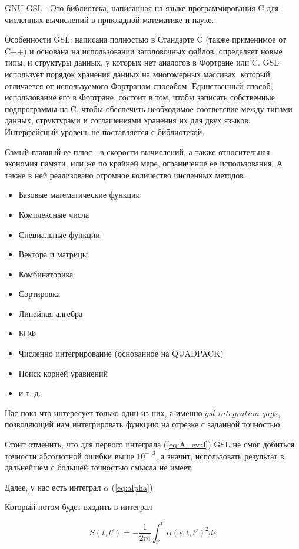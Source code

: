 \documentclass[14pt]{extarticle}
\begin{document}
GNU GSL - Это библиотека, написанная на языке программирования C для численных вычислений в прикладной математике и науке.

Особенности GSL: написана полностью в Стандарте C (также применимое от C++) и основана на использовании заголовочных файлов, определяет новые типы, и структуры данных, у которых нет аналогов в Фортране или C. GSL использует порядок хранения данных на многомерных массивах, который отличается от используемого Фортраном способом. Единственный способ, использование его в Фортране, состоит в том, чтобы записать собственные подпрограммы на C, чтобы обеспечить необходимое соответсвие между типами данных, структурами и соглашениями хранения их для двух языков. Интерфейсный уровень не поставляется с библиотекой. 

Самый главный ее плюс - в скорости вычислений, а также относительная экономия памяти, или же по крайней мере, ограничение ее использования. А также в ней реализовано огромное количество численных методов.

\begin{itemize} 
	\item Базовые математические функции
	\item Комплексные числа
	\item Специальные функции
	\item Вектора и матрицы
	\item Комбинаторика
	\item Сортировка
	\item Линейная алгебра
	\item БПФ
	\item Численно интегрирование (основанное на QUADPACK)
	\item Поиск корней уравнений
	\item и т. д.
\end{itemize}

Нас пока что интересует только один из них, а именно $gsl\_integration\_qags$, позволяющий нам интегрировать функцию на отрезке с заданной точностью. 

Стоит отменить, что для первого интеграла (\ref{eq:A_eval}) GSL не смог добиться точности абсолютной ошибки выше $10^{-13}$, а значит, использовать результат в дальнейшем с большей точностью смысла не имеет.

Далее, у нас есть интеграл $\alpha$ (\ref{eq:alpha})

Который потом будет входить в интеграл 

\begin{equation}\label{eq:s_integrate}
	S(t, t') = -\frac{1}{2m}\int_{t'}^{t} \alpha(\epsilon, t, t')^2 d\epsilon
\end{equation}
\end{document}
